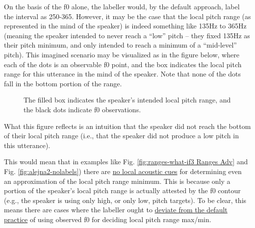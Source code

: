 \documentclass[11pt, twoside]{memoir}
\begin{document}
On the basis of the f0 alone, the labeller would, by the default approach, label the interval as 250-365. However, it may be the case that the local pitch range (as represented in the mind of the speaker) is indeed something like 135Hz to 365Hz (meaning the speaker intended to never reach a “low” pitch – they fixed 135Hz as their pitch minimum, and only intended to reach a minimum of a “mid-level” pitch). This imagined scenario may be visualized as in the figure below, where each of the dots is an observable f0 point, and the box indicates the local pitch range for this utterance in the mind of the speaker. Note that none of the dots fall in the bottom portion of the range.

\begin{figure}[H]
\centering
%
%
\caption{The filled box indicates the speaker’s intended local pitch range, and the black dots indicate f0 observations.%
\label{fig:ranges intuition alejna2}%
}
\end{figure}

What this figure reflects is an intuition that the speaker did not reach the bottom of their local pitch range (i.e., that the speaker did not produce a low pitch in this utterance).

This would mean that in examples like Fig. \ref{fig:ranges-what-if3 Ranges Adv} and Fig. \ref{fig:alejna2-nolabels}) there are \uline{no local acoustic cues} for determining even an approximation of the local pitch range minimum. This is because only a portion of the speaker’s local pitch range is actually attested by the f0 contour (e.g., the speaker is using only high, or only low, pitch targets). To be clear, this means there are cases where the labeller ought to \uline{deviate from the default practice} of using observed f0 for deciding local pitch range max\slash min.
\end{document}
